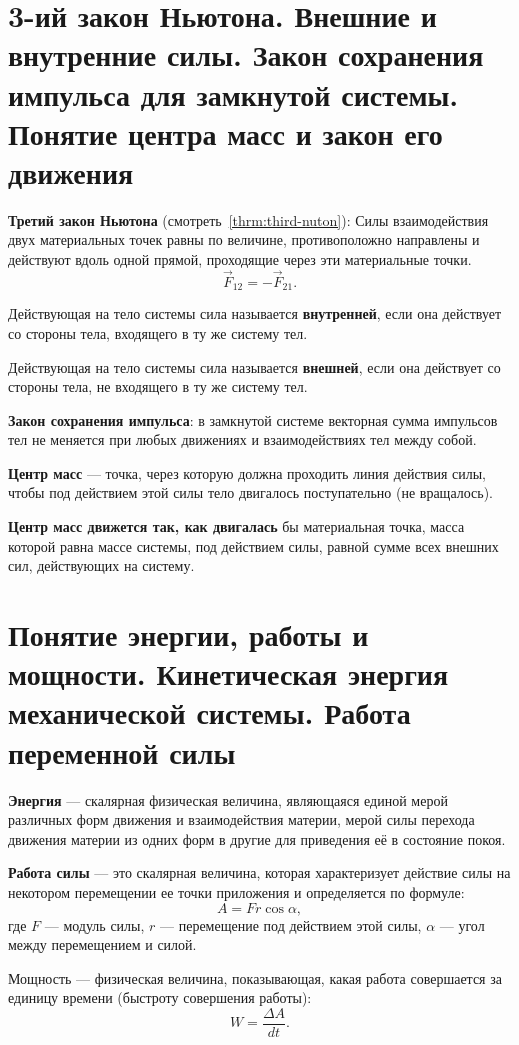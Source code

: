 \section[третий вопрос]{3-ий закон Ньютона. Внешние и внутренние силы. Закон
  сохранения импульса для замкнутой системы. Понятие центра масс и закон его
движения}

\textbf{Третий закон Ньютона} (смотреть~\ref{thrm:third-nuton}): Силы
взаимодействия двух материальных точек равны по величине, противоположно
направлены и действуют вдоль одной прямой, проходящие через эти материальные
точки. \[
  \vec{F}_{12} = -\vec{F}_{21}
.\]

Действующая на тело системы сила называется \textbf{внутренней}, если она
действует со стороны тела, входящего в ту же систему тел.

Действующая на тело системы сила называется \textbf{внешней}, если она
действует со стороны тела, не входящего в ту же систему тел.

\textbf{Закон сохранения импульса}: в замкнутой системе векторная сумма
импульсов тел не меняется при любых движениях и взаимодействиях тел между
собой.

\textbf{Центр масс} --- точка, через которую должна проходить линия действия
силы, чтобы под действием этой силы тело двигалось поступательно (не
вращалось).

\textbf{Центр масс движется так, как двигалась} бы материальная точка, масса
которой равна массе системы, под действием силы, равной сумме всех внешних сил,
действующих на систему.

\section[четвёртый вопрос]{Понятие энергии, работы и мощности. Кинетическая
энергия механической системы. Работа переменной силы}

\textbf{Энергия} — скалярная физическая величина, являющаяся единой мерой
различных форм движения и взаимодействия материи, мерой силы перехода движения
материи из одних форм в другие для приведения её в состояние покоя.

\textbf{Работа силы} --- это скалярная величина, которая характеризует действие
силы на некотором перемещении ее точки приложения и определяется по формуле: \[
  A = F r \cos{\alpha}
,\] где $F$ --- модуль силы, $r$ --- перемещение под действием этой силы,
$\alpha$ --- угол между перемещением и силой.

Мощность — физическая величина, показывающая, какая работа совершается за
единицу времени (быстроту совершения работы): \[
  W = \frac{\Delta A}{dt}
.\]

